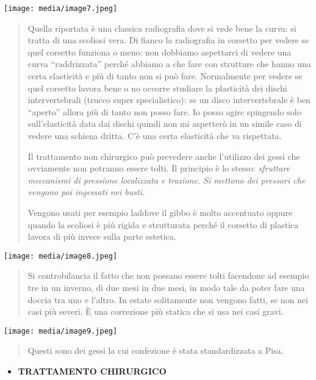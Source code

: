 \documentclass[]{article}
\begin{document}
\texttt{[image: media/image7.jpeg]}

\begin{quote}
Quella riportata è una classica radiografia dove si vede bene la curva:
si tratta di una scoliosi vera. Di fianco la radiografia in corsetto per
vedere se quel corsetto funziona o meno: non dobbiamo aspettarci di
vedere una curva ``raddrizzata'' perché abbiamo a che fare con strutture
che hanno una certa elasticità e più di tanto non si può fare.
Normalmente per vedere se quel corsetto lavora bene o no occorre
studiare la plasticità dei dischi intervertebrali (trucco super
specialistico): se un disco intervertebrale è ben ``aperto'' allora più
di tanto non posso fare. Io posso agire spingendo solo sull'elasticità
data dai dischi quindi non mi aspetterò in un simile caso di vedere una
schiena dritta. C'è una certa elasticità che va rispettata.

Il trattamento non chirurgico può prevedere anche l'utilizzo dei gessi
che ovviamente non potranno essere tolti. Il principio è lo stesso:
\emph{sfruttare meccanismi di pressione localizzata e trazione. Si
mettono dei pressori che vengono poi ingessati nei busti. }

Vengono usati per esempio laddove il gibbo è molto accentuato oppure
quando la scoliosi è più rigida e strutturata perché il corsetto di
plastica lavora di più invece sulla parte estetica.
\end{quote}

\texttt{[image: media/image8.jpeg]}

\begin{quote}
Si controbilancia il fatto che non possano essere tolti facendone ad
esempio tre in un inverno, di due mesi in due mesi, in modo tale da
poter fare una doccia tra uno e l'altro. In estate solitamente non
vengono fatti, se non nei casi più severi. È una correzione più statica
che si usa nei casi gravi.
\end{quote}

\texttt{[image: media/image9.jpeg]}

\begin{quote}
Questi sono dei gessi la cui confezione è stata standardizzata a Pisa.
\end{quote}

\begin{itemize}
\item
  \textbf{TRATTAMENTO CHIRURGICO}
\end{itemize}
\end{document}
